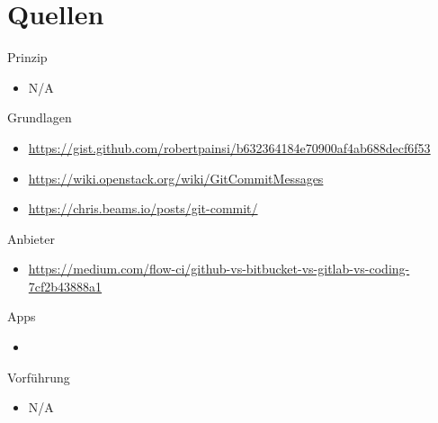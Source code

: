 \section*{Quellen}
\begin{frame}
\tiny
Prinzip
\begin{itemize}
\item N/A
\end{itemize}
Grundlagen
\begin{itemize}
\item \url{https://gist.github.com/robertpainsi/b632364184e70900af4ab688decf6f53}
\item \url{https://wiki.openstack.org/wiki/GitCommitMessages}
\item \url{https://chris.beams.io/posts/git-commit/}
\end{itemize}
Anbieter
\begin{itemize}
\item \url{https://medium.com/flow-ci/github-vs-bitbucket-vs-gitlab-vs-coding-7cf2b43888a1}
\end{itemize}
Apps
\begin{itemize}
\item
\end{itemize}
Vorführung
\begin{itemize}
\item N/A
\end{itemize}
\end{frame}